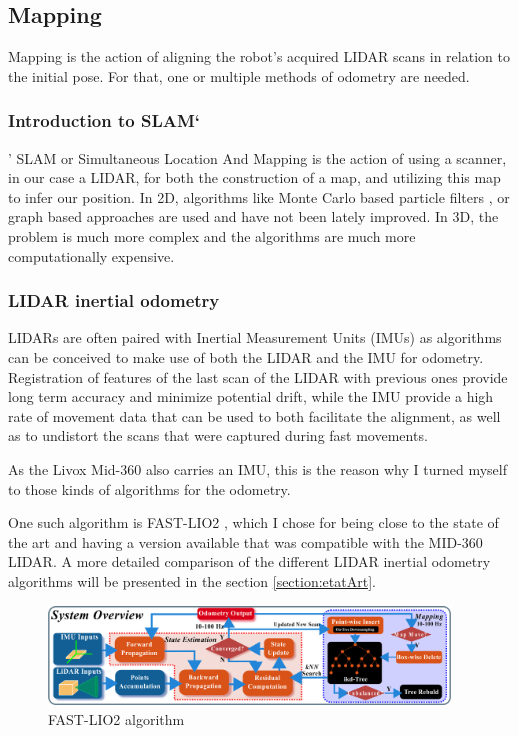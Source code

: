 \documentclass[11pt]{article}
\begin{document}
    \subsection{Mapping}

        Mapping is the action of aligning the robot's acquired LIDAR scans in relation to the initial pose. For that, one or multiple methods of odometry are needed. 
        \subsubsection{Introduction to SLAM`}'
        SLAM or Simultaneous Location And Mapping is the action of using a scanner, in our case a LIDAR, for both the construction of a map, and utilizing this map to infer our position. In 2D, algorithms like Monte Carlo based particle filters \cite{fox1999monte}, or graph based approaches \cite{macenski2021slam} are used and have not been lately improved. In 3D, the problem is much more complex and the algorithms are much more computationally expensive.  


        
        
        \subsubsection{LIDAR inertial odometry}
        
        LIDARs are often paired with Inertial Measurement Units (IMUs) as algorithms can be conceived to make use of both the LIDAR and the IMU for odometry. Registration of features of the last scan of the LIDAR with previous ones provide long term accuracy and minimize potential drift, while the IMU provide a high rate of movement data that can be used to both facilitate the alignment, as well as to undistort the scans that were captured during fast movements.
        
        As the Livox Mid-360 also carries an IMU, this is the reason why I turned myself to those kinds of algorithms for the odometry. 
        
        One such algorithm is FAST-LIO2 \cite{xu2022fast}, which I chose for being close to the state of the art and having a version available that was compatible with the MID-360 LIDAR. A more detailed comparison of the different LIDAR inertial odometry algorithms will be presented in the section \ref{section:etatArt}.
        
        
        \begin{figure}[h]
            \centering
            \includegraphics[width=0.95\textwidth]{Images/overview_fastlio2.png}
            \caption{FAST-LIO2 algorithm}
        \end{figure}
        
\end{document}
